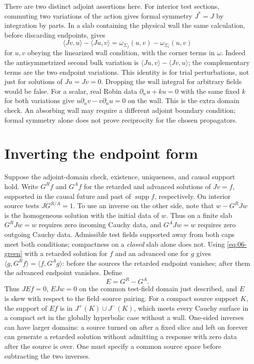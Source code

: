 There are two distinct adjoint assertions here. For interior test sections,
commuting two variations of the action gives formal symmetry $J^*=J$ by
integration by parts. In a slab containing the physical wall the same
calculation, before discarding endpoints, gives
\begin{equation}
 \langle Jv,u\rangle-\langle Ju,v\rangle
 =\omega_{\Sigma_f}(u,v)-\omega_{\Sigma_i}(u,v)
 \label{eq:06-green}
\end{equation}
for $u,v$ obeying the linearized wall condition, with the corner terms in
$\omega$. Indeed the antisymmetrized second bulk variation is
$\langle Ju,v\rangle-\langle Jv,u\rangle$; the complementary terms are the
two endpoint variations. This identity is for trial perturbations, not just
for solutions of $Ju=Jv=0$. Dropping the wall integral for arbitrary fields
would be false. For a scalar, real Robin data $\partial_n u+ku=0$ with
the same fixed $k$ for both variations give
$u\partial_n v-v\partial_n u=0$ on the wall. This is the extra domain check.
An absorbing wall may require a different adjoint boundary condition;
formal symmetry alone does not prove reciprocity for the chosen propagators.

\section{Inverting the endpoint form}
Suppose the adjoint-domain check, existence, uniqueness, and causal support
hold. Write $G^R f$ and $G^A f$ for the retarded and advanced solutions of
$Jv=f$, supported in the causal future and past of $\operatorname{supp}f$,
respectively. On interior source tests $JG^{R/A}=1$. To use an inverse on
the other side, note that $w-G^R Jw$ is the homogeneous solution with the
initial data of $w$. Thus on a finite slab $G^R Jw=w$ requires zero incoming
Cauchy data, and $G^A Jw=w$ requires zero outgoing Cauchy data. Admissible
test fields supported away from both caps meet both conditions; compactness
on a \emph{closed} slab alone does not. Using \eqref{eq:06-green} with a retarded
solution for $f$ and an advanced one for $g$ gives
$\langle g,G^R f\rangle=\langle f,G^A g\rangle$: before the sources the
retarded endpoint vanishes; after them the advanced endpoint vanishes.
Define
\[
 E=G^R-G^A.
\]
Thus $JEf=0$, $EJw=0$ on the common test-field domain just described, and
$E$ is skew with respect to the field--source pairing. For a compact source support
$K$, the support of $Ef$ is in $J^+(K)\cup J^-(K)$, which meets every Cauchy
surface in a compact set in the globally hyperbolic case without a wall.
One-sided inverses can have larger domains: a source turned on after a fixed
slice and left on forever can generate a retarded solution without admitting
a response with zero data after the source is over. One must specify a common
source space before subtracting the two inverses.

